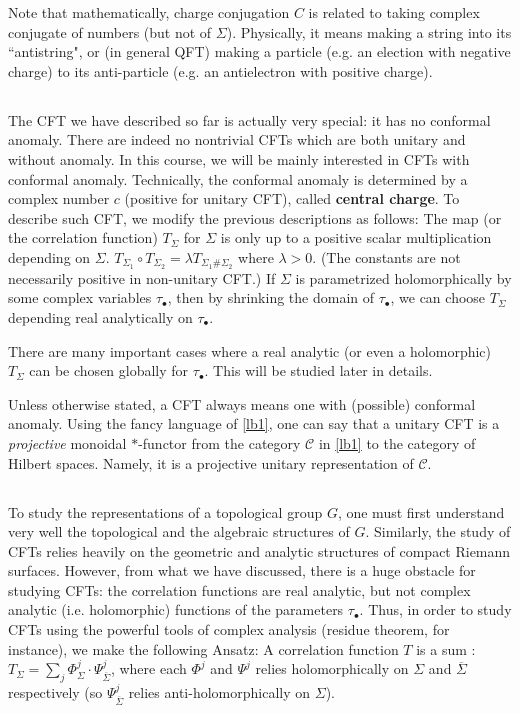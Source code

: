 \documentclass[11pt,b5paper,notitlepage]{article}
\theoremstyle{definition}
\theoremstyle{plain}
\newcommand{\ovl}{\overline}
\newcommand{\scr}{\mathscr}
\newcommand{\blt}{\bullet}
\numberwithin{equation}{section}
\begin{document}
Note that mathematically, charge conjugation $C$  is related to taking complex conjugate of numbers (but not of $\Sigma$). Physically, it means making a string  into its ``antistring", or (in general QFT) making a particle (e.g. an election with negative charge) to its anti-particle (e.g. an antielectron with positive charge). 



\subsection{}


The CFT we have described so far is actually very special: it has no conformal anomaly. There are indeed no nontrivial CFTs which are both unitary and without anomaly. In this course, we will be mainly interested in CFTs with {conformal anomaly}. Technically, the conformal anomaly is determined by a complex number $c$ (positive for unitary CFT), called \textbf{central charge}. To describe such CFT, we modify the previous descriptions as follows: The map (or the correlation function) $T_\Sigma$ for $\Sigma$ is only up to a positive scalar multiplication depending on $\Sigma$. $T_{\Sigma_1}\circ T_{\Sigma_2}=\lambda T_{\Sigma_1\#\Sigma_2}$ where $\lambda>0$. (The constants are not necessarily positive in non-unitary CFT.) If $\Sigma$ is parametrized holomorphically by some complex variables $\tau_\blt$, then by shrinking the domain of $\tau_\blt$, we can choose $T_\Sigma$ depending real analytically on $\tau_\blt$. 

There are many important cases where a real analytic (or even a holomorphic) $T_\Sigma$ can be chosen globally for $\tau_\blt$. This will be studied later in details. 

Unless otherwise stated, a CFT always means one with (possible) conformal anomaly. Using the fancy language of \ref{lb1}, one can say that a unitary CFT is a \emph{projective} monoidal $*$-functor from the category $\scr C$ in \ref{lb1} to the category of Hilbert spaces. Namely, it is a projective unitary representation of $\scr C$.


\subsection{}\label{lb35}

To study the representations of a topological group $G$, one must first understand very well the topological and the algebraic structures of $G$. Similarly, the study of CFTs relies heavily on the geometric and analytic structures of compact Riemann surfaces. However, from what we have discussed, there is a huge obstacle for studying CFTs: the correlation functions are real analytic, but not complex analytic (i.e. holomorphic) functions of the parameters $\tau_\blt$. Thus, in order to study CFTs using the powerful tools of complex analysis (residue theorem, for instance), we make the following Ansatz: A correlation function $T$ is a sum : $T_\Sigma=\sum_j \Phi^j_{\Sigma}\cdot \Psi^j_{\ovl\Sigma}$, where each $\Phi^j$ and $\Psi^j$ relies holomorphically on $\Sigma$ and $\ovl\Sigma$ respectively (so $\Psi^j_{\ovl\Sigma}$ relies anti-holomorphically on $\Sigma$).
\end{document}
